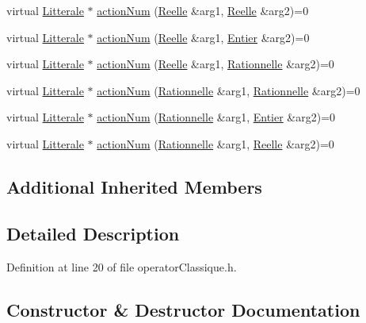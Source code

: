 \begin{DoxyCompactItemize}
\item 
virtual \hyperlink{class_litterale}{Litterale} $\ast$ \hyperlink{class_op_symbole_a98cfb6ae979dbe1974aa03387c682634}{action\+Num} (\hyperlink{class_reelle}{Reelle} \&arg1, \hyperlink{class_reelle}{Reelle} \&arg2)=0
\item 
virtual \hyperlink{class_litterale}{Litterale} $\ast$ \hyperlink{class_op_symbole_abfa9f422620f4fceaa18e5295b4c5b99}{action\+Num} (\hyperlink{class_reelle}{Reelle} \&arg1, \hyperlink{class_entier}{Entier} \&arg2)=0
\item 
virtual \hyperlink{class_litterale}{Litterale} $\ast$ \hyperlink{class_op_symbole_a184453513af4b3146e753520f1ee760f}{action\+Num} (\hyperlink{class_reelle}{Reelle} \&arg1, \hyperlink{class_rationnelle}{Rationnelle} \&arg2)=0
\item 
virtual \hyperlink{class_litterale}{Litterale} $\ast$ \hyperlink{class_op_symbole_ae63c8a614a14f75547919636e38c0901}{action\+Num} (\hyperlink{class_rationnelle}{Rationnelle} \&arg1, \hyperlink{class_rationnelle}{Rationnelle} \&arg2)=0
\item 
virtual \hyperlink{class_litterale}{Litterale} $\ast$ \hyperlink{class_op_symbole_adcacf42cf2baf8d96c0997f28d546d8e}{action\+Num} (\hyperlink{class_rationnelle}{Rationnelle} \&arg1, \hyperlink{class_entier}{Entier} \&arg2)=0
\item 
virtual \hyperlink{class_litterale}{Litterale} $\ast$ \hyperlink{class_op_symbole_a031f540060b0744e7d2fa781a505e854}{action\+Num} (\hyperlink{class_rationnelle}{Rationnelle} \&arg1, \hyperlink{class_reelle}{Reelle} \&arg2)=0
\end{DoxyCompactItemize}
\subsection*{Additional Inherited Members}


\subsection{Detailed Description}


Definition at line 20 of file operator\+Classique.\+h.



\subsection{Constructor \& Destructor Documentation}

